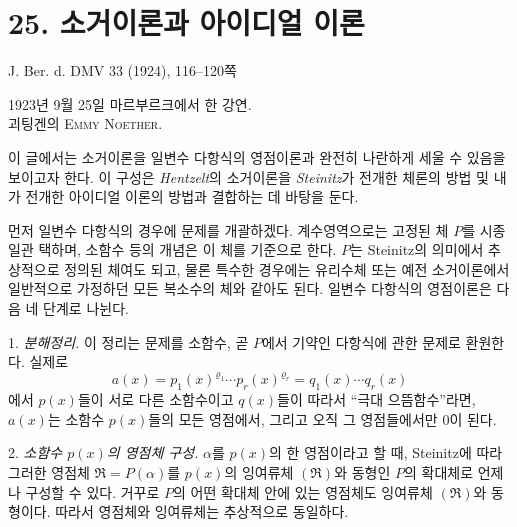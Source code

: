 
\section*{25. 소거이론과 아이디얼 이론}

\begin{center}
J. Ber. d. DMV 33 (1924), 116--120쪽
\end{center}

\setcounter{footnote}{0}

\begin{center}
1923년 9월 25일 마르부르크에서 한 강연.\\[0.5em]
괴팅겐의 \textsc{Emmy Noether}.
\end{center}

이 글에서는 소거이론을 일변수 다항식의 영점이론과 완전히 나란하게 세울 수 있음을 보이고자 한다. 이 구성은 \emph{Hentzelt}의 소거이론을 \emph{Steinitz}가 전개한 체론의 방법 및 내가 전개한 아이디얼 이론의 방법과 결합하는 데 바탕을 둔다.

먼저 일변수 다항식의 경우에 문제를 개괄하겠다. 계수영역으로는 고정된 체 \(P\)를 시종일관 택하며, 소함수 등의 개념은 이 체를 기준으로 한다. \(P\)는 Steinitz의 의미에서 추상적으로 정의된 체여도 되고, 물론 특수한 경우에는 유리수체 또는 예전 소거이론에서 일반적으로 가정하던 모든 복소수의 체와 같아도 된다. 일변수 다항식의 영점이론은 다음 네 단계로 나뉜다.

1. \emph{분해정리.} 이 정리는 문제를 소함수, 곧 \(P\)에서 기약인 다항식에 관한 문제로 환원한다. 실제로
\[
a(x)=p_1(x)^{\varrho_1}\cdots p_r(x)^{\varrho_r}=q_1(x)\cdots q_r(x)
\]
에서 \(p(x)\)들이 서로 다른 소함수이고 \(q(x)\)들이 따라서 ``극대 으뜸함수''라면, \(a(x)\)는 소함수 \(p(x)\)들의 모든 영점에서, 그리고 오직 그 영점들에서만 0이 된다.

2. \emph{소함수 \(p(x)\)의 영점체 구성.} \(\alpha\)를 \(p(x)\)의 한 영점이라고 할 때, Steinitz에 따라 그러한 영점체 \(\mathfrak R=P(\alpha)\)를 \(p(x)\)의 잉여류체 \((\mathfrak R)\)와 동형인 \(P\)의 확대체로 언제나 구성할 수 있다. 거꾸로 \(P\)의 어떤 확대체 안에 있는 영점체도 잉여류체 \((\mathfrak R)\)와 동형이다. 따라서 영점체와 잉여류체는 추상적으로 동일하다.

